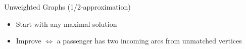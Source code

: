 \begin{frame}[<+->]{Unweighted Graphs (1/2-approximation)}
\begin{itemize}
  \item Start with any maximal solution
  \item Improve $\iff$ a passenger has two incoming arcs from unmatched vertices
\end{itemize}
\centering

\end{frame}
